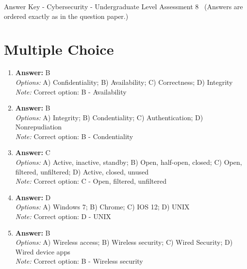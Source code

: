 \documentclass[12pt]{article}
\begin{document}
\begin{center}
Answer Key - Cybersecurity - Undergraduate Level Assessment 8 \
\small (Answers are ordered exactly as in the question paper.)
\end{center}

\section*{Multiple Choice}
\begin{enumerate}[label=\arabic*.]
\item \textbf{Answer:} B
\\ \textit{Options:} A) Confidentiality; B) Availability; C) Correctness; D) Integrity
\\ \textit{Note:} Correct option: B - Availability
\item \textbf{Answer:} B
\\ \textit{Options:} A) Integrity; B) Condentiality; C) Authentication; D) Nonrepudiation
\\ \textit{Note:} Correct option: B - Condentiality
\item \textbf{Answer:} C
\\ \textit{Options:} A) Active, inactive, standby; B) Open, half-open, closed; C) Open, filtered, unfiltered; D) Active, closed, unused
\\ \textit{Note:} Correct option: C - Open, filtered, unfiltered
\item \textbf{Answer:} D
\\ \textit{Options:} A) Windows 7; B) Chrome; C) IOS 12; D) UNIX
\\ \textit{Note:} Correct option: D - UNIX
\item \textbf{Answer:} B
\\ \textit{Options:} A) Wireless access; B) Wireless security; C) Wired Security; D) Wired device apps
\\ \textit{Note:} Correct option: B - Wireless security
\end{enumerate}
\end{document}

